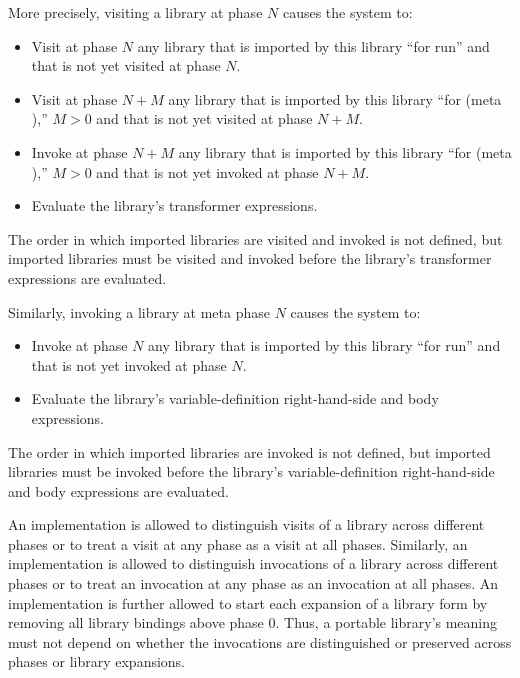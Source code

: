 More precisely, visiting a library at phase $N$ causes the system to:

\begin{itemize}
\item Visit at phase $N$ any library that is imported by this library
      ``for {\cf run}'' and that is not yet visited at phase $N$.
\item Visit at phase $N+M$ any library that is imported by this
      library ``for {\cf (meta )},'' $M>0$ and that is not yet
      visited at phase $N+M$.
\item Invoke at phase $N+M$ any library that is imported by this
      library ``for {\cf (meta )},'' $M>0$ and that is not yet
      invoked at phase $N+M$.
\item Evaluate the library's transformer expressions.
\end{itemize}

The order in which imported libraries are visited and invoked is not
defined, but imported libraries must be visited and invoked before the
library's transformer expressions are evaluated.

Similarly, invoking a library at meta phase $N$ causes the system to:

\begin{itemize}
\item Invoke at phase $N$ any library that is imported by this library
      ``for {\cf run}'' and that is not yet invoked at phase $N$.
\item Evaluate the library's variable-definition right-hand-side and body
      expressions.
\end{itemize}

The order in which imported libraries are invoked is not defined, but
imported libraries must be invoked before the library's variable-definition
right-hand-side and body expressions are evaluated.

An implementation is allowed to distinguish visits of a library across
different phases or to treat a visit at any phase as a visit at all
phases.
Similarly, an implementation is allowed to distinguish invocations of a
library across different phases or to treat an invocation at any phase as
an invocation at all phases.
An implementation is further allowed to start each expansion of a
{\cf library} form by removing all library bindings above phase 0.
Thus, a portable library's meaning must not depend on whether the
invocations are distinguished or preserved across phases or {\cf library}
expansions.

